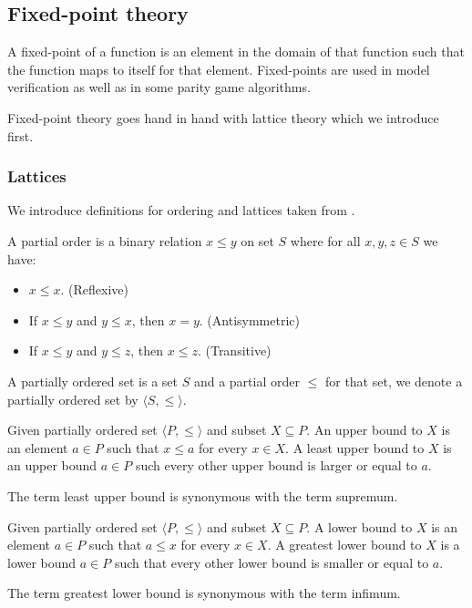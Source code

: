 \subsection{Fixed-point theory} 
A fixed-point of a function is an element in the domain of that function such that the function maps to itself for that element. Fixed-points are used in model verification as well as in some parity game algorithms.

Fixed-point theory goes hand in hand with lattice theory which we introduce first.
\subsubsection{Lattices}
We introduce definitions for ordering and lattices taken from \cite{birkhoff1940lattice}.
\begin{definition}
	A partial order is a binary relation $x \leq y$ on set $S$ where for all $x,y,z \in S$ we have:
	\begin{itemize}
		\item $x \leq x$. (Reflexive)
		\item If $x \leq y$ and $y \leq x$, then $x=y$. (Antisymmetric)
		\item If $x \leq y$ and $y \leq z$, then $x \leq z$. (Transitive)
	\end{itemize}
\end{definition}

\begin{definition}
	A partially ordered set is a set $S$ and a partial order $\leq$ for that set, we denote a partially ordered set by $\langle S, \leq \rangle$.
\end{definition}

\begin{definition}
	Given partially ordered set $\langle P,\leq \rangle$ and subset $X \subseteq P$. An upper bound to $X$ is an element $a \in P$ such that $x \leq a$ for every $x\in X$. A least upper bound to $X$ is an upper bound $a \in P$ such every other upper bound is larger or equal to $a$.
\end{definition}
The term least upper bound is synonymous with the term supremum.
\begin{definition}
	Given partially ordered set $\langle P,\leq \rangle$ and subset $X \subseteq P$. A lower bound to $X$ is an element $a \in P$ such that $a \leq x$ for every $x\in X$. A greatest lower bound to $X$ is a lower bound $a \in P$ such that every other lower bound is smaller or equal to $a$.
\end{definition}
The term greatest lower bound is synonymous with the term infimum.

